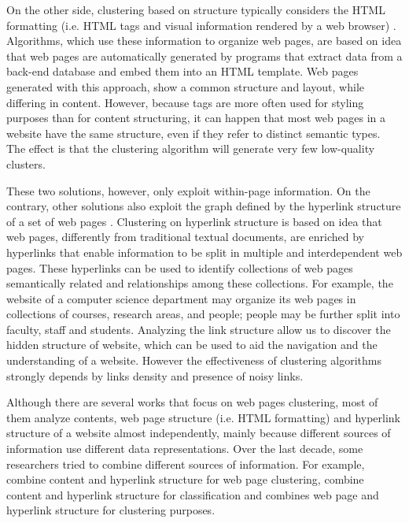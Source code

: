 On the other side, clustering based on structure typically considers the HTML formatting (i.e. HTML tags and visual information rendered by a web browser) \cite{Crescenzi:2005, Buttler:2004, Bohunsky:2010}. Algorithms, which use these information to organize web pages, are based on idea that web pages are automatically generated by programs that extract data from a back-end database and embed them into an HTML template. Web pages generated with this approach, show a common structure and layout, while differing in content. 
However, because tags are more often used for styling purposes than for content structuring, it can happen that most web pages in a website have the same structure, even if they refer to distinct semantic types. The effect is that the clustering algorithm will generate very few low-quality clusters.


These two solutions, however, only exploit within-page information. On the contrary, other solutions also exploit the graph  defined by the hyperlink structure of a set of web pages \cite{Lin:2010, Qi:2006}. 
Clustering on hyperlink structure is based on idea that web pages, differently from traditional textual documents, are enriched by hyperlinks that enable information to be split in multiple and
interdependent web pages. These hyperlinks can be used to identify collections of web pages semantically related and relationships among these collections. For example, the website of a computer science department may organize its web pages in collections of courses, research areas, and people; people may be further split into faculty, staff and students. Analyzing the link structure allow us to discover the hidden structure of website, which can be used to aid the navigation and the understanding of a website.
However the effectiveness of clustering algorithms strongly depends by links density and presence of noisy links.

Although there are several works that focus on web pages clustering, most of them analyze contents, web page structure (i.e. HTML formatting) and hyperlink structure of a website almost independently, mainly because different sources of information use different data representations. Over the last decade, some researchers tried to combine different sources of information. For example, \cite{He:2002, Modha:2000, Wang:2002, Drost:2005, Angelova:2006, Lin:2010} combine content and hyperlink structure for web page clustering, \cite{Glover:2002, Halkidi:2003, Calado:2003,Qi:2006, Zhu:2007} combine content and hyperlink structure for classification and \cite{Crescenzi:2005} combines web page and hyperlink structure for clustering purposes. 

